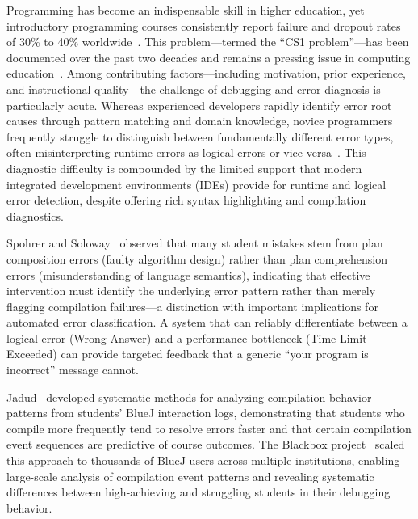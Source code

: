 \documentclass[10pt,a4paper]{article}
\begin{document}
Programming has become an indispensable skill in higher education, yet
introductory programming courses consistently report failure and dropout rates
of 30\% to 40\% worldwide~\cite{bennedsen2007failure,watson2018failure}. This
problem---termed the ``CS1 problem''---has been
documented over the past two decades and remains a pressing
issue in computing education~\cite{pears2007survey}. Among contributing
factors---including motivation, prior experience,
and instructional quality---the challenge of debugging and error diagnosis is
particularly acute. Whereas experienced developers rapidly identify
error root causes through pattern matching and domain knowledge, novice
programmers frequently struggle to distinguish between fundamentally different
error types, often misinterpreting runtime errors as logical errors or vice
versa~\cite{mccauley2008evidence}. This diagnostic difficulty is compounded by
the limited support that modern integrated development environments (IDEs)
provide for runtime and logical error detection, despite offering rich
syntax highlighting and compilation diagnostics.

Spohrer and Soloway~\cite{spohrer1986novice} observed that many student
mistakes stem from plan composition errors (faulty algorithm design) rather
than plan comprehension errors (misunderstanding of language semantics),
indicating that effective intervention must identify the underlying
error pattern rather than merely flagging compilation failures---a distinction
with important implications for automated error classification.
A system that can reliably differentiate between a logical error (Wrong
Answer) and a performance bottleneck (Time Limit Exceeded) can provide
targeted feedback that a generic ``your program is incorrect'' message cannot.

Jadud~\cite{jadud2006methods} developed systematic methods
for analyzing compilation behavior patterns from students' BlueJ interaction
logs, demonstrating that students who compile more frequently tend to resolve
errors faster and that certain compilation event sequences are predictive of
course outcomes. The Blackbox project~\cite{bey2022analyzing} scaled this
approach to thousands of BlueJ users across multiple institutions, enabling
large-scale analysis of compilation event patterns and revealing systematic
differences between high-achieving and struggling students in their debugging
behavior.
\end{document}
